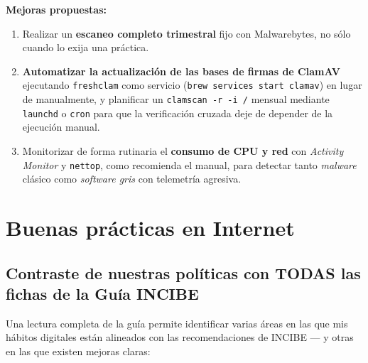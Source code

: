 \textbf{Mejoras propuestas:}

\begin{enumerate}[leftmargin=*]
    \item Realizar un \textbf{escaneo completo trimestral} fijo con Malwarebytes, no sólo cuando lo exija una práctica.
    \item \textbf{Automatizar la actualización de las bases de firmas de ClamAV} ejecutando \texttt{freshclam} como servicio (\texttt{brew services start clamav}) en lugar de manualmente, y planificar un \texttt{clamscan -r -i /} mensual mediante \texttt{launchd} o \texttt{cron} para que la verificación cruzada deje de depender de la ejecución manual.
    \item Monitorizar de forma rutinaria el \textbf{consumo de CPU y red} con \textit{Activity Monitor} y \texttt{nettop}, como recomienda el manual, para detectar tanto \textit{malware} clásico como \textit{software gris} con telemetría agresiva.
\end{enumerate}

\section{Buenas prácticas en Internet}
\label{sec:concl-buenas-practicas}

\subsection{Contraste de nuestras políticas con TODAS las fichas de la Guía INCIBE}

Una lectura completa de la guía permite identificar varias áreas en las que mis hábitos digitales están alineados con las recomendaciones de INCIBE --- y otras en las que existen mejoras claras:

